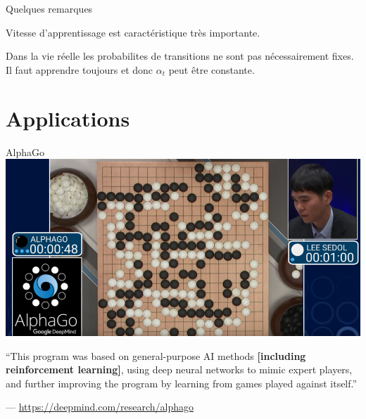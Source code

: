 \documentclass{beamer}
\begin{document}
\begin{frame}{Quelques remarques}
  
  Vitesse d'apprentissage est caractéristique très importante.

  \vspace{1em}

  Dans la vie réelle les probabilites de transitions ne sont pas
  nécessairement fixes.  Il faut apprendre toujours et donc $\alpha_t$
  peut être constante.

\end{frame}



\section{Applications}



\begin{frame}{AlphaGo}
  \includegraphics[width=\textwidth]{figs/alphago.png}

  \vspace{1ex}

  ``This program was based on general-purpose AI methods {\bf
    [including reinforcement learning]}, using deep neural networks to
  mimic expert players, and further improving the program by learning
  from games played against itself.''

  \hfill \scriptsize --- \url{https://deepmind.com/research/alphago}
\end{frame}
\end{document}
